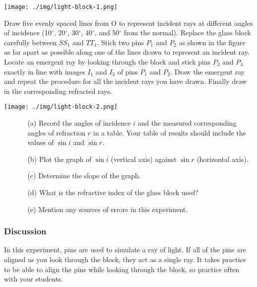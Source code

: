 \begin{center}
\texttt{[image: ./img/light-block-1.png]}
\end{center}

Draw five evenly spaced lines from O to represent incident rays at different
angles of incidence (10$^\circ$, 20$^\circ$, 30$^\circ$, 40$^\circ$, and 50$^\circ$ from the normal). Replace the
glass block carefully between $SS_1$ and $TT_1$. Stick two pins $P_1$ and $P_2$ as shown in
the figure as far apart as possible along one of the lines drawn to represent an
incident ray. Locate an emergent ray by looking through the block and stick pins
$P_3$ and $P_4$ exactly in line with images $I_1$ and $I_2$ of pins $P_1$ and $P_2$. Draw the
emergent ray and repeat the procedure for all the incident rays you have drawn. Finally draw in the corresponding refracted rays.

\begin{center}
\texttt{[image: ./img/light-block-2.png]}
\end{center}

\begin{enumerate}
\item[]
\begin{enumerate}
\item[(a)]{Record the angles of incidence $i$ and the measured corresponding angles of
refraction $r$ in a table. Your table of results should include the values of
$\sin{i}$ and $\sin{r}$.}
\item[(b)]{Plot the graph of $\sin{i}$ (vertical axis) against $\sin{r}$ (horizontal axis).}
\item[(c)]{Determine the slope of the graph.}
\item[(d)]{What is the refractive index of the glass block used?}
\item[(e)]{Mention any sources of errors in this experiment.}
\end{enumerate}
\end{enumerate}

\subsubsection{Discussion}

In this experiment, pins are used to simulate a ray of light. If all of the pins are
aligned as you look through the block, they act as a single ray. It takes practice to be able
to align the pins while looking through the block, so practice often with your students.

